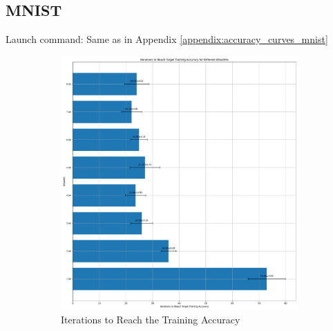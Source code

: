     \subsection{MNIST}
    \label{appendix:iterations_mnist}
        Launch command: Same as in Appendix \ref{appendix:accuracy_curves_mnist}
        \begin{figure}[H]
            \centering
            \begin{subfigure}[H]{0.48\textwidth}
                \centering
                \includegraphics[width=\textwidth]{../standard/MNIST/plots/mnist_train_iters.pdf}
                \caption{Iterations to Reach the Training Accuracy}
            \end{subfigure}
            \hfill
            \begin{subfigure}[H]{0.48\textwidth}
                \centering

\end{subfigure}
\end{figure}
